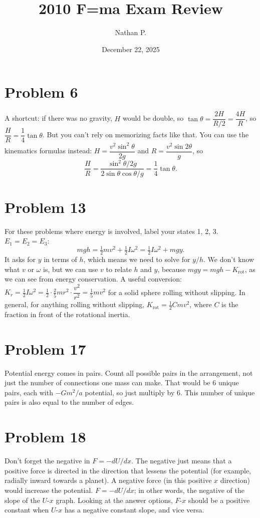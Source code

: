 \documentclass[11pt]{article}
\title{2010 F=ma Exam Review}
\author{Nathan P.}
\date{December 22, 2025}
\begin{document}
\maketitle

\section*{Problem 6}
A shortcut: if there was no gravity, $H$ would be double, so $\tan\theta=\dfrac{2H}{R/2}=\dfrac{4H}{R}$, so $\dfrac HR=\dfrac14\tan\theta$. But you can't rely on memorizing facts like that.
You can use the kinematics formulas instead: $H=\dfrac{v^2\sin^2\theta}{2g}$ and $R=\dfrac{v^2\sin2\theta}{g}$, so
\[
\frac HR=\frac{\sin^2\theta/2g}{2\sin\theta\cos\theta/g}=\frac14\tan\theta.
\]

\section*{Problem 13}
For these problems where energy is involved, label your states 1, 2, 3. $E_1=E_2=E_3$:
\[
mgh=\tfrac12mv^2+\tfrac12I\omega^2=\tfrac12I\omega^2+mgy.
\]
It asks for $y$ in terms of $h$, which means we need to solve for $y/h$.
We don't know what $v$ or $\omega$ is, but we can use $v$ to relate $h$ and $y$, because $mgy=mgh-K_{\text{rot}}$, as we can see from energy conservation.
A useful conversion: $K_r=\tfrac12I\omega^2=\tfrac12\cdot\tfrac25mr^2\cdot\dfrac{v^2}{r^2}=\tfrac15mv^2$ for a solid sphere rolling without slipping. In general, for anything rolling without slipping, $K_{\text{rot}}=\tfrac12Cmv^2$, where $C$ is the fraction in front of the rotational inertia.

\section*{Problem 17}
Potential energy comes in pairs.
Count all possible pairs in the arrangement, not just the number of connections one mass can make.
That would be 6 unique pairs, each with $-Gm^2/a$ potential, so just multiply by 6. This number of unique pairs is also equal to the number of edges.

\section*{Problem 18}
Don't forget the negative in $F=-dU/dx$. The negative just means that a positive force is directed in the direction that lessens the potential (for example, radially inward towards a planet). A negative force (in this positive $x$ direction) would increase the potential.
$F=-dU/dx$; in other words, the negative of the slope of the $U$-$x$ graph. Looking at the answer options, $F$-$x$ should be a positive constant when $U$-$x$ has a negative constant slope, and vice versa.
\end{document}
